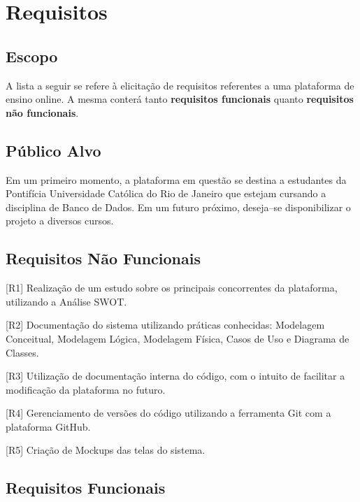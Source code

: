 \documentclass[graduacao,brazil]{ThesisPUC}
\begin{document}

\section{Requisitos}

\subsection{Escopo}

A lista a seguir se refere \`{a} elicita\c{c}\~{a}o de requisitos \cite{Leite03} referentes a uma plataforma de ensino online.
A mesma conter\'{a} tanto \textbf{requisitos funcionais} quanto \textbf{requisitos n\~{a}o funcionais}.

\subsection{P\'{u}blico Alvo}

Em um primeiro momento, a plataforma em quest\~{a}o se destina a estudantes da Pontif\'{i}cia Universidade
Cat\'{o}lica do Rio de Janeiro que estejam cursando a disciplina de Banco de Dados. Em um futuro pr\'{o}ximo, 
deseja--se disponibilizar o projeto a diversos cursos.

\subsection{Requisitos N\~{a}o Funcionais}

[R1] Realiza\c{c}\~{a}o de um estudo sobre os principais concorrentes da plataforma, utilizando a An\'{a}lise SWOT.

[R2] Documenta\c{c}\~{a}o do sistema utilizando pr\'{a}ticas conhecidas: Modelagem Conceitual, Modelagem L\'{o}gica,
Modelagem F\'{i}sica, Casos de Uso e Diagrama de Classes.

[R3] Utiliza\c{c}\~{a}o de documenta\c{c}\~{a}o interna do c\'{o}digo, com o intuito de facilitar a modifica\c{c}\~{a}o da 
plataforma no futuro.

[R4] Gerenciamento de vers\~{o}es do c\'{o}digo utilizando a ferramenta Git com a plataforma GitHub.

[R5] Cria\c{c}\~{a}o de Mockups das telas do sistema.

\subsection{Requisitos Funcionais}
\end{document}
